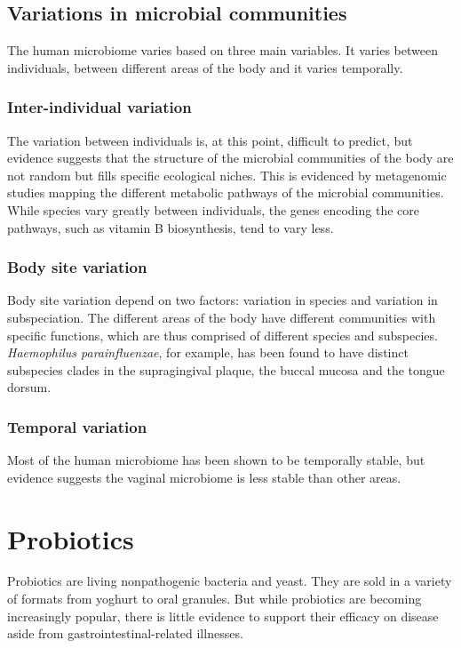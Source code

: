 \documentclass[12pt]{article}
\begin{document}
\subsection{Variations in microbial communities}
The human microbiome varies based on three main variables. It varies between individuals, between different areas of the body and it varies temporally\cite{Lloyd-Price2017}. 

\subsubsection{Inter-individual variation}
The variation between individuals is, at this point, difficult to predict, but evidence suggests that the structure of the microbial communities of the body are not random but fills specific ecological niches. This is evidenced by metagenomic studies mapping the different metabolic pathways of the microbial communities. While species vary greatly between individuals, the genes encoding the core pathways, such as vitamin B biosynthesis, tend to vary less\cite{Lloyd-Price2017}.

\subsubsection{Body site variation} 
Body site variation depend on two factors: variation in species and variation in subspeciation. The different areas of the body have different communities with specific functions, which are thus comprised of different species and subspecies\cite{Lloyd-Price2017}.
\textit{Haemophilus parainfluenzae}, for example, has been found to have distinct subspecies clades in the supragingival plaque, the buccal mucosa and the tongue dorsum\cite{Lloyd-Price2017}.

\subsubsection{Temporal variation}
Most of the human microbiome has been shown to be temporally stable, but evidence suggests the vaginal microbiome is less stable than other areas\cite{Lloyd-Price2017}. 

\section{Probiotics} 
Probiotics are living nonpathogenic bacteria and yeast. They are sold in a variety of formats from yoghurt to oral granules. But while probiotics are becoming increasingly popular, there is little evidence to support their efficacy on disease aside from gastrointestinal-related illnesses\cite{Islam2016}. 
\end{document}
